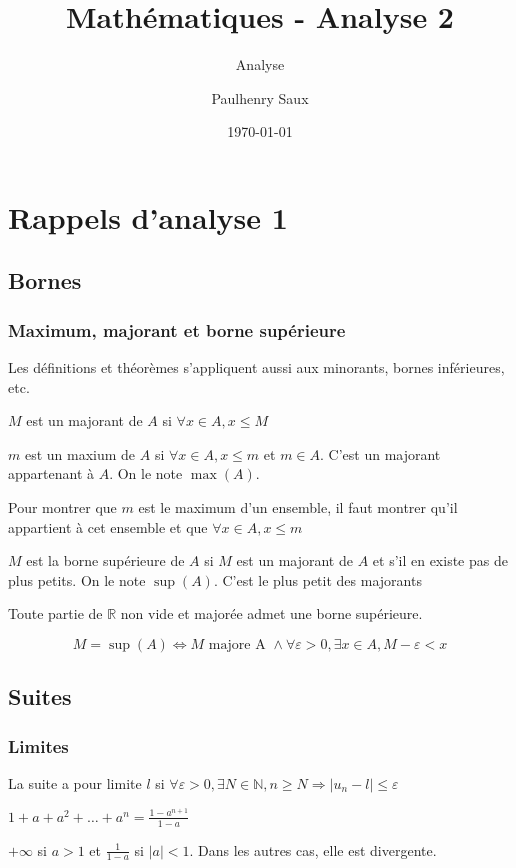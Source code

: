 \documentclass[french]{yLectureNote}
\title{Mathématiques - Analyse 2}
\subtitle{Analyse}
\author{Paulhenry Saux}
\date{\today}
\begin{document}
	\chapter{Rappels d'analyse 1 }
\section{Bornes}
\subsection{Maximum, majorant et borne supérieure}
Les définitions et théorèmes s'appliquent aussi aux minorants, bornes inférieures, etc.
\begin{definition}[Majorant]
$M$ est un majorant de $A$ si $\forall x\in A, x\leq M$
\end{definition}
\begin{definition}[Maximum]
$m$ est un maxium de $A$ si $\forall x\in A, x\leq m$ et $m\in A$. C'est un majorant appartenant à $A$. On le note $\max(A)$.
\end{definition}
Pour montrer que $m$ est le maximum d'un ensemble, il faut montrer qu'il appartient à cet ensemble et que \(\forall x\in A, x\leq m\)
\begin{definition}
$M$ est la borne supérieure de $A$ si $M$ est un majorant de $A$ et s'il en existe pas de plus petits. On le note $\sup(A)$. C'est le plus petit des majorants
\end{definition}
\begin{theorem}
 Toute partie de $\mathbb{R}$ non vide et majorée admet une borne supérieure.
\end{theorem}
\begin{proposition}
\[M=\sup(A) \iff M\text{ majore A } \wedge \forall \varepsilon > 0, \exists x \in A, M-\varepsilon < x\]
\end{proposition}
\section{Suites}
\subsection{Limites}
\begin{definition}
La suite a pour limite $l$ si \(\forall \varepsilon > 0, \exists N \in \mathbb{N}, n\geq N \Rightarrow |u_n-l|\leq \varepsilon\)
\end{definition}
\begin{definition}
\(1+a+a^2+\dots+a^n = \frac{1-a^{n+1}}{1-a}\)
\end{definition}
\begin{proposition}
$+\infty$ si $a>1$ et $\frac{1}{1-a}$ si $|a|<1$. Dans les autres cas, elle est divergente.
\end{proposition}
\end{document}
